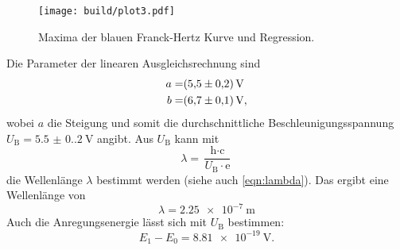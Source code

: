 \begin{figure}[H]
  \centering
  \texttt{[image: build/plot3.pdf]}
  \caption{Maxima der blauen Franck-Hertz Kurve und Regression.}
  \label{fig:15}
\end{figure}
Die Parameter der linearen Ausgleichsrechnung sind
\begin{align}
  a =& \qty{5.5 (0.2)}{\volt} \\
  b =& \qty{6.7 (1)}{\volt},
\end{align}
wobei $a$ die Steigung und somit die durchschnittliche Beschleunigungsspannung
$U_\text{B} = \qty{5.5(0.2)}{\volt}$ angibt.
Aus $U_\text{B}$ kann mit 
\begin{equation}
  \lambda = \frac{\text{h} \cdot \text{c}}{U_\text{B} \cdot \text{e}}
\end{equation}
die Wellenlänge $\lambda$ bestimmt werden (siehe auch \autoref{eqn:lambda}).
Das ergibt eine Wellenlänge von 
\begin{equation}
  \lambda = \qty{2.25e-7} {\meter}
\end{equation}
Auch die Anregungsenergie lässt sich mit $U_\text{B}$ bestimmen:
\begin{equation}
  E_1 - E_0 = \qty{8.81e-19}{\volt}.
\end{equation}
